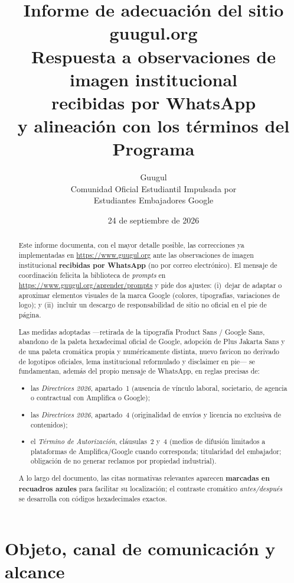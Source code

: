 \documentclass[11pt,a4paper]{article}
\title{\textbf{Informe de adecuación del sitio\\guugul.org}\\[0.4em]
\large Respuesta a observaciones de imagen institucional\\recibidas por WhatsApp\\y alineación con los términos del Programa}
\author{Guugul\\[0.2em]
\small Comunidad Oficial Estudiantil Impulsada por\\Estudiantes Embajadores Google}
\date{24 de septiembre de 2026}
\begin{document}
\maketitle

\begin{abstract}
\noindent
Este informe documenta, con el mayor detalle posible, las correcciones ya implementadas en \url{https://www.guugul.org} ante las observaciones de imagen institucional \textbf{recibidas por WhatsApp} (no por correo electrónico). El mensaje de coordinación felicita la biblioteca de \emph{prompts} en \url{https://www.guugul.org/aprender/prompts} y pide dos ajustes: (i)~dejar de adaptar o aproximar elementos visuales de la marca Google (colores, tipografías, variaciones de logo); y (ii)~incluir un descargo de responsabilidad de sitio no oficial en el pie de página.

Las medidas adoptadas ---retirada de la tipografía Product Sans / Google Sans, abandono de la paleta hexadecimal oficial de Google, adopción de Plus Jakarta Sans y de una paleta cromática propia y numéricamente distinta, nuevo favicon no derivado de logotipos oficiales, lema institucional reformulado y disclaimer en pie--- se fundamentan, además del propio mensaje de WhatsApp, en reglas precisas de:

\begin{itemize}[leftmargin=*,nosep]
  \item las \emph{Directrices 2026}, apartado~1 (ausencia de vínculo laboral, societario, de agencia o contractual con Amplifica o Google);
  \item las \emph{Directrices 2026}, apartado~4 (originalidad de envíos y licencia no exclusiva de contenidos);
  \item el \emph{Término de Autorización}, cláusulas~2 y~4 (medios de difusión limitados a plataformas de Amplifica/Google cuando corresponda; titularidad del embajador; obligación de no generar reclamos por propiedad industrial).
\end{itemize}

A lo largo del documento, las citas normativas relevantes aparecen \textbf{marcadas en recuadros azules} para facilitar su localización; el contraste cromático \emph{antes/después} se desarrolla con códigos hexadecimales exactos.
\end{abstract}

\tableofcontents
\newpage

\section{Objeto, canal de comunicación y alcance}
\end{document}
